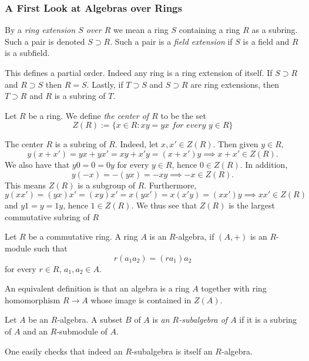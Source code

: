 \subsubsection{A First Look at Algebras over Rings}
\begin{definition}
    By a \textit{ring extension $S$ over $R$} we mean a ring $S$ containing a ring $R$ as a subring. Such a pair is denoted $S\supset R$. Such a pair is a \textit{field extension} if $S$ is a field and $R$ is a subfield.
\end{definition}
\begin{remark}
    This defines a partial order. Indeed any ring is a ring extension of itself. If $S\supset R$ and $R\supset S$ then $R=S$. Lastly, if $T\supset S$ and $S\supset R$ are ring extensions, then $T\supset R$ and $R$ is a subring of $T$.
\end{remark}
\begin{definition}
    Let $R$ be a ring. We define \textit{the center of $R$} to be the set 
    $$Z(R):= \{x \in R : xy =yx \textit{ for every } y \in R\}$$
\end{definition}
\begin{remark}
    The center $R$ is a subring of $R$. Indeed, let $x,x'\in Z(R)$. Then given $y\in R,$ 
    $$y(x+x') = yx+yx' = xy+x'y= (x+x')y \implies x+x' \in Z(R).$$
    We also have that $y0=0=0y$ for every $y\in R$, hence $0\in Z(R)$. In addition,
    $$y(-x) = -(yx) = -xy\implies -x \in Z(R).$$
    This means $Z(R)$ is a subgroup of $R$. Furthermore, 
    $$y(xx')= (yx)x'=(xy)x'=x(yx') = x(x'y)=(xx')y \implies xx' \in Z(R)$$
    and $y1=y=1y$, hence $1\in Z(R)$. We thus see that $Z(R)$ is the largest commutative subring of $R$
\end{remark}
\begin{definition}
    Let $R$ be a commutative ring. A ring $A$ is an $R$-algebra, if $(A,+)$ is an $R$-module such that 
    $$r(a_1a_2)=(ra_1)a_2$$ 
    for every $r\in R$, $a_1,a_2\in A$.
\end{definition}
\begin{remark}
    An equivalent definition is that an algebra is a ring $A$ together with ring homomorphism $R\rightarrow A$ whose image is contained in $Z(A)$.
\end{remark}
\begin{definition}
    Let $A$ be an $R$-algebra. A subset $B$ of $A$ is \textit{an $R$-subalgebra of $A$} if it is a subring of $A$ and an $R$-submodule of $A$.
\end{definition}
\begin{remark}
    One easily checks that indeed an $R$-subalgebra is itself an $R$-algebra.
\end{remark}
